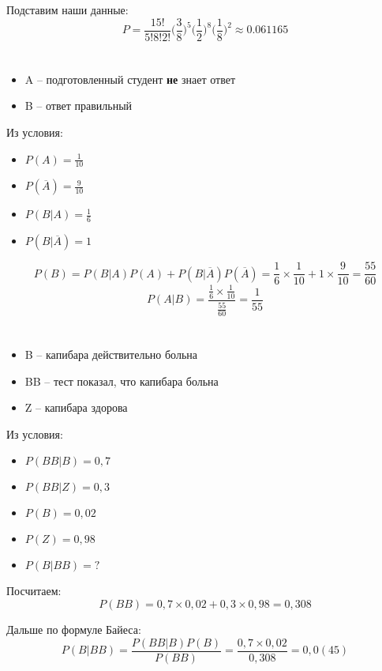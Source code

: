 \documentclass[a4paper,10pt]{article}
\begin{document}
Подставим наши данные:
$$
P = \frac{15!}{5! 8! 2!} \bigg(\frac{3}{8}\bigg)^5
\bigg(\frac{1}{2}\bigg)^8 \bigg(\frac{1}{8}\bigg)^2
\approx 0.061165
$$

\section{}
\begin{itemize}
 \item A -- подготовленный студент \textbf{не} знает ответ
 \item B -- ответ правильный
\end{itemize}
Из условия:
\begin{itemize}
 \item $P(A) = \frac{1}{10}$
 \item $P(\overline{A}) = \frac{9}{10}$
 \item $P(B|A) = \frac{1}{6}$
 \item $P(B|\overline{A}) = 1$
\end{itemize}

$$
P(B) = P(B|A)P(A) + P(B|\overline{A})P(\overline{A})
= \frac{1}{6} \times \frac{1}{10} + 1 \times \frac{9}{10}
= \frac{55}{60}
$$
$$ P(A|B) = \frac{\frac{1}{6} \times \frac{1}{10}}{\frac{55}{60}} = \frac{1}{55} $$

\section{}
\begin{itemize}
 \item B -- капибара действительно больна
 \item BB -- тест показал, что капибара больна
 \item Z -- капибара здорова
\end{itemize}
Из условия:
\begin{itemize}
 \item $P(BB|B) = 0,7$
 \item $P(BB|Z) = 0,3$
 \item $P(B) = 0,02$
 \item $P(Z) = 0,98$
 \item $P(B|BB) = ?$
\end{itemize}

Посчитаем:
$$ P(BB) = 0,7 \times 0,02 + 0,3 \times 0,98 = 0,308 $$

Дальше по формуле Байеса:
$$
P(B|BB) = \frac{P(BB|B)P(B)}{P(BB)}
= \frac{0,7 \times 0,02}{0,308} = 0,0(45)
$$
\end{document}
